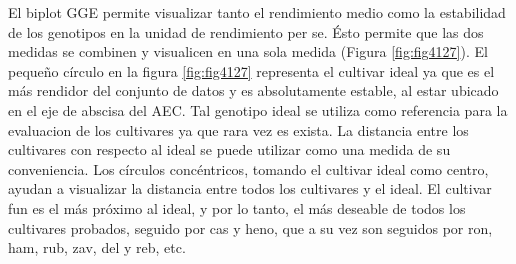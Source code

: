 
El biplot GGE permite visualizar tanto el rendimiento medio como la estabilidad de los genotipos en la unidad de rendimiento per se. Ésto permite que las dos medidas se combinen y visualicen en una sola medida (Figura \ref{fig:fig4127}). El pequeño círculo en la figura \ref{fig:fig4127} representa el cultivar ideal ya que es el más rendidor del conjunto de datos y es absolutamente estable, al estar ubicado en el eje de abscisa del AEC. Tal genotipo ideal se utiliza como referencia para la evaluacion de los cultivares ya que rara vez es exista. La distancia entre los cultivares con respecto al ideal se puede utilizar como una medida de su conveniencia. Los círculos concéntricos, tomando el cultivar ideal como centro, ayudan a visualizar la distancia entre todos los cultivares y el ideal. El cultivar fun es el más próximo al ideal, y por lo tanto, el más deseable de todos los cultivares probados, seguido por cas y heno, que a su vez son seguidos por ron, ham, rub, zav, del y reb, etc.



